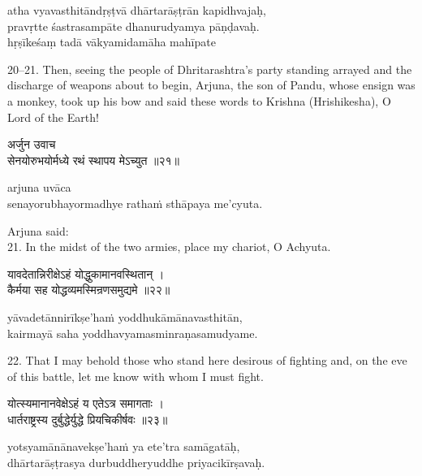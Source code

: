 \begin{transliteration}
atha vyavasthitāndṛṣṭvā dhārtarāṣṭrān kapidhvajaḥ, \\
pravṛtte śastrasampāte dhanurudyamya pāṇḍavaḥ. \\
hṛṣīkeśaṃ tadā vākyamidamāha mahīpate
\end{transliteration}

20--21. Then, seeing the people of Dhritarashtra's party standing arrayed and the
discharge of weapons about to begin, Arjuna, the son of Pandu, whose ensign was
a monkey, took up his bow and said these words to Krishna (Hrishikesha), O Lord
of the Earth!

\begin{gitaverse}
अर्जुन उवाच \\
सेनयोरुभयोर्मध्ये रथं स्थापय मेऽच्युत ॥२१॥
\end{gitaverse}

\begin{transliteration}
arjuna uvāca \\
senayorubhayormadhye rathaṁ sthāpaya me'cyuta.
\end{transliteration}

Arjuna said: \\
21. In the midst of the two armies, place my chariot, O Achyuta.

\begin{gitaverse}
यावदेतान्निरीक्षेऽहं योद्धुकामानवस्थितान् । \\
कैर्मया सह योद्धव्यमस्मिन्रणसमुद्यमे ॥२२॥
\end{gitaverse}

\begin{transliteration}
yāvadetānnirīkṣe'haṁ yoddhukāmānavasthitān, \\
kairmayā saha yoddhavyamasminraṇasamudyame.
\end{transliteration}

22. That I may behold those who stand here desirous of fighting and, on the eve
of this battle, let me know with whom I must fight.

\begin{gitaverse}
योत्स्यमानानवेक्षेऽहं य एतेऽत्र समागताः । \\
धार्तराष्ट्रस्य दुर्बुद्धेर्युद्धे प्रियचिकीर्षवः ॥२३॥
\end{gitaverse}

\begin{transliteration}
yotsyamānānavekṣe'haṁ ya ete'tra samāgatāḥ, \\
dhārtarāṣṭrasya durbuddheryuddhe priyacikīrṣavaḥ.
\end{transliteration}

